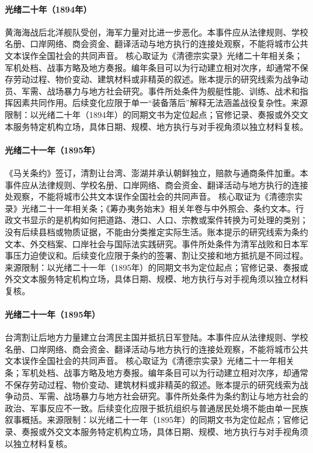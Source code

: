 \hypertarget{civic:EQ-1894-YALU-NAVAL-BATTLE}{}\paragraph{光绪二十年（1894年）}黄海海战后北洋舰队受创，海军力量对比进一步恶化。本事件应从法律规则、学校名册、口岸网络、商会资金、翻译活动与地方执行的连接处观察，不能将城市公共文本误作全国社会的共同声音。 核心取证为《清德宗实录》光绪二十年相关条；军机处档、战事方略及地方奏报。编年条目可以为行动建立相对次序，却通常不保存劳动过程、物价变动、建筑材料或非精英的叙述。账本提示的研究线索为战争动员、军需、战场暴力与地方社会研究。事件所处条件为舰艇性能、训练、战术和指挥因素共同作用。后续变化应限于单一“装备落后”解释无法涵盖战役复杂性。来源限制：以光绪二十年（1894年）的同期文书为定位起点；官修记录、奏报或外交文本服务特定机构立场，具体日期、规模、地方执行与对手视角须以独立材料复核。
\hypertarget{civic:EQ-1895-SHIMONOSEKI-TREATY}{}\paragraph{光绪二十一年（1895年）}《马关条约》签订，清割让台湾、澎湖并承认朝鲜独立，赔款与通商条件加重。本事件应从法律规则、学校名册、口岸网络、商会资金、翻译活动与地方执行的连接处观察，不能将城市公共文本误作全国社会的共同声音。 核心取证为《清德宗实录》光绪二十一年相关条；《筹办夷务始末》相关年卷与中外照会、条约文本。行政文书显示的是机构如何把道路、港口、人口、宗教或案件转换为可处理的类别；没有后续县档或物质证据，不能由分类推定实际生活。账本提示的研究线索为条约文本、外交档案、口岸社会与国际法实践研究。事件所处条件为清军战败和日本军事压力迫使议和。后续变化应限于条约的签署、割让交接和地方抵抗是不同过程。来源限制：以光绪二十一年（1895年）的同期文书为定位起点；官修记录、奏报或外交文本服务特定机构立场，具体日期、规模、地方执行与对手视角须以独立材料复核。
\hypertarget{civic:EQ-1895-TAIWAN-REPUBLIC-RESISTANCE}{}\paragraph{光绪二十一年（1895年）}台湾割让后地方力量建立台湾民主国并抵抗日军登陆。本事件应从法律规则、学校名册、口岸网络、商会资金、翻译活动与地方执行的连接处观察，不能将城市公共文本误作全国社会的共同声音。 核心取证为《清德宗实录》光绪二十一年相关条；军机处档、战事方略及地方奏报。编年条目可以为行动建立相对次序，却通常不保存劳动过程、物价变动、建筑材料或非精英的叙述。账本提示的研究线索为战争动员、军需、战场暴力与地方社会研究。事件所处条件为条约割让与地方社会的政治、军事反应不一致。后续变化应限于抵抗组织与普通居民处境不能由单一民族叙事概括。来源限制：以光绪二十一年（1895年）的同期文书为定位起点；官修记录、奏报或外交文本服务特定机构立场，具体日期、规模、地方执行与对手视角须以独立材料复核。
